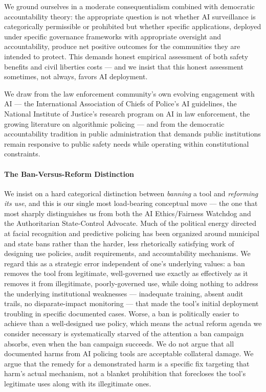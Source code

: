 We ground ourselves in a moderate consequentialism combined with
democratic accountability theory: the appropriate question is not
whether AI surveillance is categorically permissible or prohibited but
whether specific applications, deployed under specific governance
frameworks with appropriate oversight and accountability, produce net
positive outcomes for the communities they are intended to protect. This
demands honest empirical assessment of both safety benefits and civil
liberties costs --- and we insist that this honest assessment sometimes,
not always, favors AI deployment.

We draw from the law enforcement community's own evolving engagement
with AI --- the International Association of Chiefs of Police's AI
guidelines, the National Institute of Justice's research program on AI
in law enforcement, the growing literature on algorithmic policing ---
and from the democratic accountability tradition in public
administration that demands public institutions remain responsive to
public safety needs while operating within constitutional constraints.

\paragraph{The Ban-Versus-Reform
Distinction}\label{the-ban-versus-reform-distinction}

We insist on a hard categorical distinction between \emph{banning} a
tool and \emph{reforming its use}, and this is our single most
load-bearing conceptual move --- the one that most sharply distinguishes
us from both the AI Ethics/Fairness Watchdog and the Authoritarian
State-Control Advocate. Much of the political energy directed at facial
recognition and predictive policing has been organized around municipal
and state bans rather than the harder, less rhetorically satisfying work
of designing use policies, audit requirements, and accountability
mechanisms. We regard this as a strategic error independent of one's
underlying values: a ban removes the tool from legitimate, well-governed
use exactly as effectively as it removes it from illegitimate,
poorly-governed use, while doing nothing to address the underlying
institutional weaknesses --- inadequate training, absent audit trails,
no disparate-impact monitoring --- that made the tool's initial
deployment troubling in specific documented cases. Worse, a ban is
politically easier to achieve than a well-designed use policy, which
means the actual reform agenda we consider necessary is systematically
starved of the attention a ban campaign absorbs, even when the ban
campaign succeeds. We do not argue that all documented harms from AI
policing tools are acceptable collateral damage. We argue that the
remedy for a demonstrated harm is a specific fix targeting that harm's
actual mechanism, not a blanket prohibition that forecloses the tool's
legitimate uses along with its illegitimate ones.

